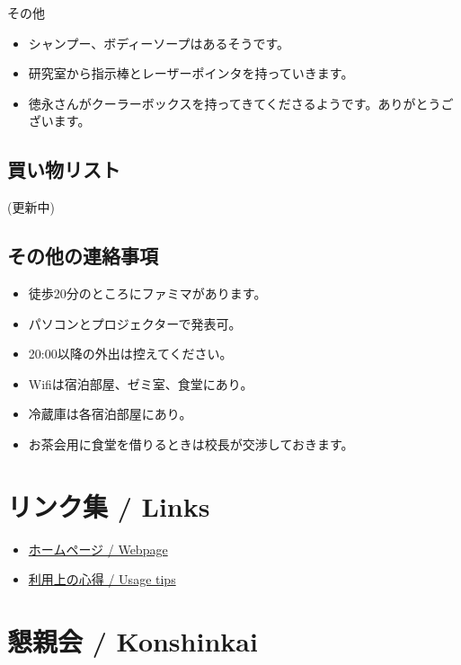 \documentclass[unicode,a4paper,11pt]{ltjsarticle}
\begin{document}
その他

\begin{itemize}
      \item
            シャンプー、ボディーソープはあるそうです。
      \item
            研究室から指示棒とレーザーポインタを持っていきます。
      \item
            徳永さんがクーラーボックスを持ってきてくださるようです。ありがとうございます。
\end{itemize}

\subsection*{買い物リスト}

(更新中)

\subsection*{その他の連絡事項}

\begin{itemize}
      \item
            徒歩20分のところにファミマがあります。
      \item
            パソコンとプロジェクターで発表可。
      \item
            20:00以降の外出は控えてください。
      \item
            Wifiは宿泊部屋、ゼミ室、食堂にあり。
      \item
            冷蔵庫は各宿泊部屋にあり。
      \item
            お茶会用に食堂を借りるときは校長が交渉しておきます。
\end{itemize}


\section{リンク集 / Links}

\begin{itemize}
      \item
            \href{https://www.waseda.jp/inst/student/facility/seminar/facility/izukawana}{ホームページ / Webpage}
      \item
            \href{https://www.waseda.jp/inst/student/facility/seminar/flow/tips}{利用上の心得 / Usage tips}
\end{itemize}


\section{懇親会 / Konshinkai}
\end{document}
